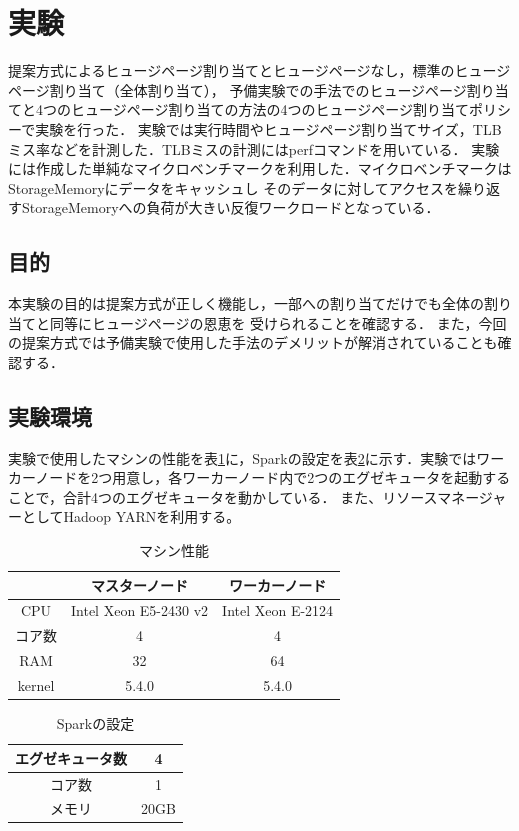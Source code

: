\section{実験} \label{section:evaluation}
提案方式によるヒュージページ割り当てとヒュージページなし，標準のヒュージページ割り当て（全体割り当て），
予備実験での手法でのヒュージページ割り当てと4つのヒュージページ割り当ての方法の4つのヒュージページ割り当てポリシーで実験を行った．
実験では実行時間やヒュージページ割り当てサイズ，TLBミス率などを計測した．TLBミスの計測にはperf\cite{perf}コマンドを用いている．
実験には作成した単純なマイクロベンチマークを利用した．マイクロベンチマークはStorageMemoryにデータをキャッシュし
そのデータに対してアクセスを繰り返すStorageMemoryへの負荷が大きい反復ワークロードとなっている．

\subsection{目的}
本実験の目的は提案方式が正しく機能し，一部への割り当てだけでも全体の割り当てと同等にヒュージページの恩恵を
受けられることを確認する．
また，今回の提案方式では予備実験で使用した手法のデメリットが解消されていることも確認する．

\subsection{実験環境}
実験で使用したマシンの性能を表\ref{tab:master-node}に，Sparkの設定を表\ref{tab:spark-config}に示す．実験ではワーカーノードを2つ用意し，各ワーカーノード内で2つのエグゼキュータを起動することで，合計4つのエグゼキュータを動かしている．
また、リソースマネージャーとしてHadoop YARN\cite{vavilapalli2013apache}を利用する。
\begin{table}
	\caption{マシン性能}
	\label{tab:master-node}
	\centering
	\begin{tabular}{ccc}
		\hline
		 & マスターノード & ワーカーノード \\
		\hline
		CPU & Intel Xeon E5-2430 v2 & Intel Xeon E-2124 \\
		\hline
		コア数 & 4 & 4 \\
		\hline
		RAM & 32 & 64 \\
		\hline
		kernel & 5.4.0 & 5.4.0\\
		\hline
	\end{tabular}
\end{table}
\begin{table}
	\caption{Sparkの設定}
	\label{tab:spark-config}
	\centering
	\begin{tabular}{cc}
		\hline
		エグゼキュータ数 & 4 \\
		\hline
		コア数 & 1 \\
		\hline
		メモリ & 20GB \\
		\hline
	\end{tabular}
\end{table}

